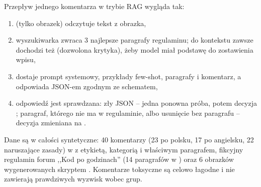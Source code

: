 Przepływ jednego komentarza w trybie RAG wygląda tak:
\begin{enumerate}
  \item (tylko obrazek)  odczytuje tekst z obrazka,
  \item wyszukiwarka zwraca 3 najlepsze paragrafy regulaminu; do kontekstu zawsze dochodzi też 
        (dozwolona krytyka), żeby model miał podstawę do zostawienia wpisu,
  \item {} dostaje prompt systemowy, przykłady few-shot, paragrafy i komentarz, a odpowiada JSON-em
        zgodnym ze schematem,
  \item odpowiedź jest sprawdzana: zły JSON -- jedna ponowna próba, potem decyzja ; paragraf, którego
        nie ma w regulaminie, albo usunięcie bez paragrafu -- decyzja zmieniana na .
\end{enumerate}

Dane są w całości syntetyczne: 40 komentarzy (23 po polsku, 17 po angielsku, 22 naruszające zasady) w
 z etykietą, kategorią i właściwym paragrafem, fikcyjny regulamin forum ,,Kod po godzinach''
(14 paragrafów w ) oraz 6 obrazków wygenerowanych skryptem
. Komentarze toksyczne są celowo łagodne i nie zawierają prawdziwych wyzwisk wobec
grup.
